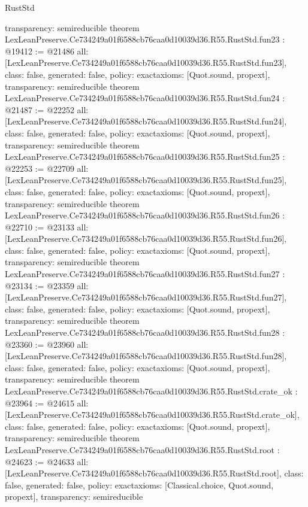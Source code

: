 \begin{lexlean}{RustStd}
\begin{coremodule}
{  transparency: semireducible
}
theorem LexLeanPreserve.Ce734249a01f6588cb76caa0d10039d36.R55.RustStd.fun23 : @19412 := @21486 {
  all: [LexLeanPreserve.Ce734249a01f6588cb76caa0d10039d36.R55.RustStd.fun23],
  class: false,
  generated: false,
  policy: exact{axioms: [Quot.sound, propext]},
  transparency: semireducible
}
theorem LexLeanPreserve.Ce734249a01f6588cb76caa0d10039d36.R55.RustStd.fun24 : @21487 := @22252 {
  all: [LexLeanPreserve.Ce734249a01f6588cb76caa0d10039d36.R55.RustStd.fun24],
  class: false,
  generated: false,
  policy: exact{axioms: [Quot.sound, propext]},
  transparency: semireducible
}
theorem LexLeanPreserve.Ce734249a01f6588cb76caa0d10039d36.R55.RustStd.fun25 : @22253 := @22709 {
  all: [LexLeanPreserve.Ce734249a01f6588cb76caa0d10039d36.R55.RustStd.fun25],
  class: false,
  generated: false,
  policy: exact{axioms: [Quot.sound, propext]},
  transparency: semireducible
}
theorem LexLeanPreserve.Ce734249a01f6588cb76caa0d10039d36.R55.RustStd.fun26 : @22710 := @23133 {
  all: [LexLeanPreserve.Ce734249a01f6588cb76caa0d10039d36.R55.RustStd.fun26],
  class: false,
  generated: false,
  policy: exact{axioms: [Quot.sound, propext]},
  transparency: semireducible
}
theorem LexLeanPreserve.Ce734249a01f6588cb76caa0d10039d36.R55.RustStd.fun27 : @23134 := @23359 {
  all: [LexLeanPreserve.Ce734249a01f6588cb76caa0d10039d36.R55.RustStd.fun27],
  class: false,
  generated: false,
  policy: exact{axioms: [Quot.sound, propext]},
  transparency: semireducible
}
theorem LexLeanPreserve.Ce734249a01f6588cb76caa0d10039d36.R55.RustStd.fun28 : @23360 := @23960 {
  all: [LexLeanPreserve.Ce734249a01f6588cb76caa0d10039d36.R55.RustStd.fun28],
  class: false,
  generated: false,
  policy: exact{axioms: [Quot.sound, propext]},
  transparency: semireducible
}
theorem LexLeanPreserve.Ce734249a01f6588cb76caa0d10039d36.R55.RustStd.crate_ok : @23964 := @24615 {
  all: [LexLeanPreserve.Ce734249a01f6588cb76caa0d10039d36.R55.RustStd.crate_ok],
  class: false,
  generated: false,
  policy: exact{axioms: [Quot.sound, propext]},
  transparency: semireducible
}
theorem LexLeanPreserve.Ce734249a01f6588cb76caa0d10039d36.R55.RustStd.root : @24623 := @24633 {
  all: [LexLeanPreserve.Ce734249a01f6588cb76caa0d10039d36.R55.RustStd.root],
  class: false,
  generated: false,
  policy: exact{axioms: [Classical.choice, Quot.sound, propext]},
  transparency: semireducible
}


\end{coremodule}
\end{lexlean}
